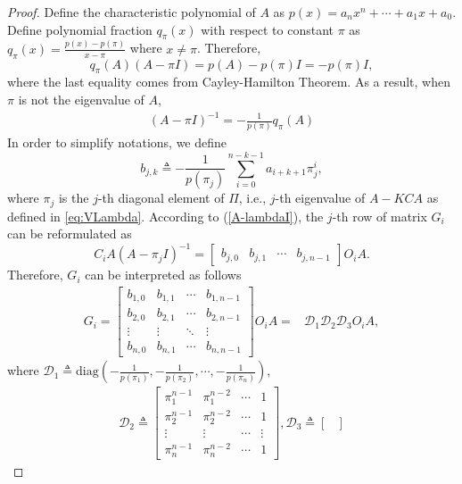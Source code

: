 \documentclass[12pt]{article}
\newtheorem*{proof}{\textbf{Proof}}
\begin{document}
\begin{proof}
	Define the characteristic polynomial of $A$ as $p(x)=a_n x^n +\cdots+a_1 x +a_0$.
	Define polynomial fraction  $q_\pi(x)$ with respect to constant $\pi$ as
	$q_\pi(x)=\frac{p(x)-p(\pi)}{x-\pi}$ where $x\neq \pi$.
	Therefore,
	$$q_\pi(A)(A-\pi I) = p(A)-p(\pi)I=-p(\pi)I ,$$
	where the last equality comes from Cayley-Hamilton Theorem.
	As a result, when $\pi$ is not the eigenvalue of $A$,
	\begin{align}\label{A-lambdaI}
		(A-\pi I)^{-1}=-\frac{1}{p(\pi)} q_\pi(A)
	\end{align}
	In order to simplify notations, we define 
	\begin{equation}\label{eq:bjk}
		b_{j,k}\triangleq-\frac{1}{p(\pi_j)}\sum_{i=0}^{n-k-1} a_{i+k+1} \pi_j^i,
	\end{equation}
	where $\pi_j$ is the $j$-th diagonal element of $\Pi$, i.e., $j$-th eigenvalue of $A-KCA$ as defined in \eqref{eq:VLambda}.
	According to (\ref{A-lambdaI}), the $j$-th row of matrix $G_i$ can be reformulated as
	$$C_{i} A\left(A-\pi_{j} I\right)^{-1}=
	\begin{bmatrix}
		b_{j,0} & b_{j,1} & \cdots  & b_{j,n-1} 
	\end{bmatrix} O_i A.$$
	Therefore, $G_i$ can be interpreted as follows
	\begin{align*}
		G_i = \begin{bmatrix}
			b_{1,0} & b_{1,1} & \cdots  & b_{1,n-1} \\
			b_{2,0} & b_{2,1} & \cdots  & b_{2,n-1} \\
			\vdots & \vdots & \ddots  & \vdots \\
			b_{n,0} & b_{n,1} & \cdots  & b_{n,n-1} 
		\end{bmatrix}
		O_i A 
		= & \mathcal{D}_1\mathcal{D}_2\mathcal{D}_3 O_i A , %
	\end{align*}
	where $\mathcal{D}_1\triangleq\text{diag}\left(-\frac{1}{p(\pi_1)},-\frac{1}{p(\pi_2)},\cdots,-\frac{1}{p(\pi_n)}\right)$,
	\begin{align*}
		\mathcal{D}_2\triangleq
		\begin{bmatrix}
			\pi_1^{n-1} & \pi_1^{n-2} & \cdots  & 1 \\
			\pi_2^{n-1} & \pi_2^{n-2} & \cdots  & 1 \\
			\vdots & \vdots & \cdots  & \vdots \\
			\pi_n^{n-1} & \pi_n^{n-2} & \cdots  & 1
		\end{bmatrix}, 
		\mathcal{D}_3\triangleq
		\begin{bmatrix}

\end{bmatrix}
\end{align*}
\end{proof}
\end{document}
